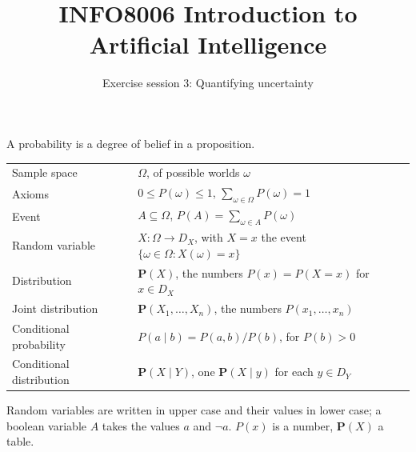 \documentclass[11pt, a4paper]{exam}
\title{\bfseries INFO8006 Introduction to Artificial Intelligence}
\author{Exercise session 3: Quantifying uncertainty}
\date{}
\begin{document}
\maketitle

\begin{recap}
    A probability is a degree of belief in a proposition.
    \begin{center}
        \begin{tabular}{ll}
            \toprule
            Sample space & $\Omega$, of possible worlds $\omega$ \\
            Axioms & $0 \leq P(\omega) \leq 1$, \quad $\sum_{\omega \in \Omega} P(\omega) = 1$ \\
            Event & $A \subseteq \Omega$, \quad $P(A) = \sum_{\omega \in A} P(\omega)$ \\
            Random variable & $X : \Omega \to D_X$, with $X = x$ the event $\{\omega \in \Omega : X(\omega) = x\}$ \\
            Distribution & $\mathbf{P}(X)$, the numbers $P(x) = P(X = x)$ for $x \in D_X$ \\
            Joint distribution & $\mathbf{P}(X_1, \ldots, X_n)$, the numbers $P(x_1, \ldots, x_n)$ \\
            Conditional probability & $P(a \mid b) = P(a, b) / P(b)$, for $P(b) > 0$ \\
            Conditional distribution & $\mathbf{P}(X \mid Y)$, one $\mathbf{P}(X \mid y)$ for each $y \in D_Y$ \\
            \bottomrule
        \end{tabular}
    \end{center}
    Random variables are written in upper case and their values in lower case; a boolean variable $A$ takes the values $a$ and $\neg a$. $P(x)$ is a number, $\mathbf{P}(X)$ a table.


\end{recap}
\end{document}
